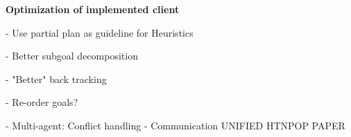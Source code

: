 \documentclass[Main]{subfiles}
\begin{document}
\textbf{Optimization of implemented client}

- Use partial plan as guideline for Heuristics

- Better subgoal decomposition

- "Better" back tracking

- Re-order goals?

- Multi-agent: Conflict handling
- Communication
UNIFIED HTNPOP PAPER
\end{document}
